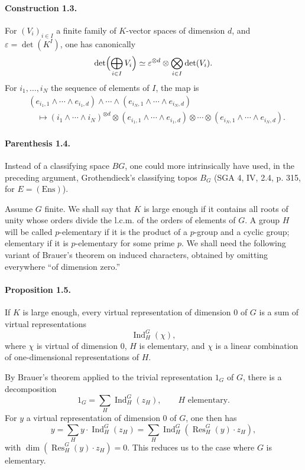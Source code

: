 \documentclass[10pt]{article}
\newcommand{\Ind}{\operatorname{Ind}}
\newcommand{\Res}{\operatorname{Res}}
\begin{document}
\paragraph{Construction 1.3.} For \((V_i)_{i\in I}\) a finite family of \(K\)-vector spaces of dimension \(d\), and \(\varepsilon=\det(K^I)\), one has canonically
\[
\det\Bigl(\bigoplus_{i\in I}V_i\Bigr)\simeq
\varepsilon^{\otimes d}\otimes\bigotimes_{i\in I}\det(V_i).
\]
For \(i_1,\ldots,i_N\) the sequence of elements of \(I\), the map is
\[
\begin{aligned}
&(e_{i_1,1}\wedge\cdots\wedge e_{i_1,d})\wedge\cdots\wedge
(e_{i_N,1}\wedge\cdots\wedge e_{i_N,d}) \\
&\quad\longmapsto
(i_1\wedge\cdots\wedge i_N)^{\otimes d}\otimes
(e_{i_1,1}\wedge\cdots\wedge e_{i_1,d})\otimes\cdots\otimes
(e_{i_N,1}\wedge\cdots\wedge e_{i_N,d}).
\end{aligned}
\]

\paragraph{Parenthesis 1.4.} Instead of a classifying space \(BG\), one could more intrinsically have used, in the preceding argument, Grothendieck's classifying topos \(B_G\) (SGA 4, IV, 2.4, p. 315, for \(E=(\mathrm{Ens})\)).

Assume \(G\) finite. We shall say that \(K\) is large enough if it contains all roots of unity whose orders divide the l.c.m. of the orders of elements of \(G\). A group \(H\) will be called \(p\)-elementary if it is the product of a \(p\)-group and a cyclic group; elementary if it is \(p\)-elementary for some prime \(p\). We shall need the following variant of Brauer's theorem on induced characters, obtained by omitting everywhere ``of dimension zero.''

\paragraph{Proposition 1.5.} If \(K\) is large enough, every virtual representation of dimension \(0\) of \(G\) is a sum of virtual representations
\[
\Ind_H^G(\chi),
\]
where \(\chi\) is virtual of dimension \(0\), \(H\) is elementary, and \(\chi\) is a linear combination of one-dimensional representations of \(H\).

By Brauer's theorem applied to the trivial representation \(1_G\) of \(G\), there is a decomposition
\[
1_G=\sum_H \Ind_H^G(z_H),
\qquad H\text{ elementary}.
\]
For \(y\) a virtual representation of dimension \(0\) of \(G\), one then has
\[
y=\sum_H y\cdot \Ind_H^G(z_H)
  =\sum_H\Ind_H^G(\Res_H^G(y)\cdot z_H),
\]
with \(\dim(\Res_H^G(y)\cdot z_H)=0\). This reduces us to the case where \(G\) is elementary.
\end{document}
